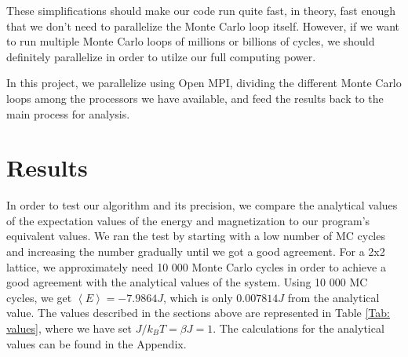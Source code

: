 \documentclass{article}
\begin{document}
		These simplifications should make our code run quite fast, in theory, fast enough that we don't need to parallelize the Monte Carlo loop itself. However, if we want to run multiple Monte Carlo loops of millions or billions of cycles, we should definitely parallelize in order to utilze our full computing power.

		In this project, we parallelize using Open MPI, dividing the different Monte Carlo loops among the processors we have available, and feed the results back to the main process for analysis.

\section{Results}
	In order to test our algorithm and its precision, we compare the analytical values of the expectation values of the energy and magnetization to our program's equivalent values. We ran the test by starting with a low number of MC cycles and increasing the number gradually until we got a good agreement.
	For a 2x2 lattice, we approximately need 10 000 Monte Carlo cycles in order to achieve a good agreement with the analytical values of the system. Using 10 000 MC cycles, we get $\left<E\right> = -7.9864 J$, which is only $0.007814 J$ from the analytical value. The values described in the sections above are represented in Table \ref{Tab: values}, where we have set $J/k_BT =\beta J = 1$. The calculations for the analytical values can be found in the Appendix.
\end{document}
